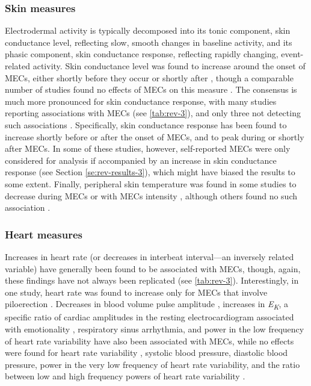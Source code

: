 \subsubsection{Skin measures}

Electrodermal activity is typically decomposed into its tonic component, skin conductance level, reflecting slow, smooth changes in baseline activity, and its phasic component, skin conductance response, reflecting rapidly changing, event-related activity. Skin conductance level was found to increase around the onset of MECs, either shortly before they occur \parencite{grewe2009a} or shortly after \parencite{benedek2011, mori2017}, though a comparable number of studies found no effects of MECs on this measure \parencite{baltes2011, carr2016, jaimovich2013, schafer2011}. The consensus is much more pronounced for skin conductance response, with many studies reporting associations with MECs (see \autoref{tab:rev-3}), and only three not detecting such associations \parencite{blood2001, carr2016, jaimovich2013}. Specifically, skin conductance response has been found to increase shortly before \parencite{egermann2011, grewe2009a, salimpoor2009} or after \parencite{benedek2011, grewe2011, mori2017} the onset of MECs, and to peak during \parencite{craig2005, salimpoor2009} or shortly after \parencite{grewe2009a, mori2017} MECs. In some of these studies, however, self-reported MECs were only considered for analysis if accompanied by an increase in skin conductance response (see Section \ref{se:rev-results-3}), which might have biased the results to some extent. Finally, peripheral skin temperature was found in some studies to decrease during MECs \parencite{salimpoor2009} or with MECs intensity \parencite{salimpoor2011}, although others found no such association \parencite{blood2001, craig2005, rickard2004}.

\subsubsection{Heart measures}

Increases in heart rate (or decreases in interbeat interval---an inversely related variable) have generally been found to be associated with MECs, though, again, these findings have not always been replicated (see \autoref{tab:rev-3}). Interestingly, in one study, heart rate was found to increase only for MECs that involve piloerection \parencite{sumpf2015}. Decreases in blood volume pulse amplitude \parencite{benedek2011, salimpoor2009, salimpoor2011}, increases in \emph{E\textsubscript{K}}, a specific ratio of cardiac amplitudes in the resting electrocardiogram associated with emotionality \parencite{sumpf2015}, respiratory sinus arrhythmia, and power in the low frequency of heart rate variability \parencite{baltes2011} have also been associated with MECs, while no effects were found for heart rate variability \parencite{carr2016}, systolic blood pressure, diastolic blood pressure, power in the very low frequency of heart rate variability, and the ratio between low and high frequency powers of heart rate variability \parencite{baltes2011}.

